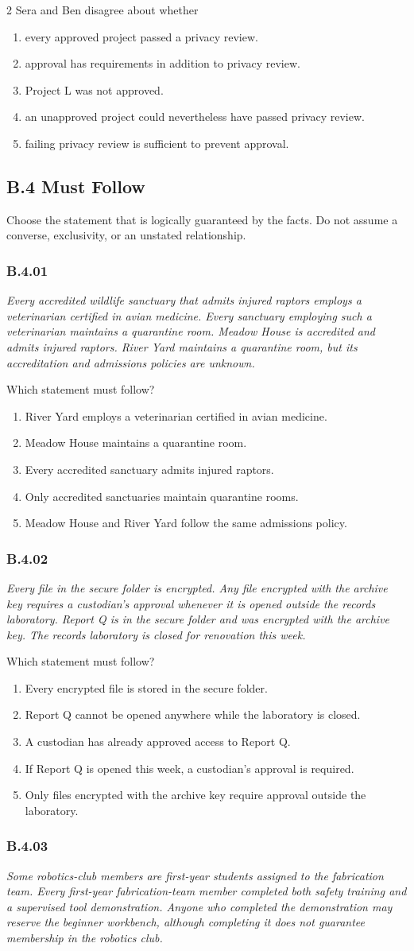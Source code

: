 \documentclass[10pt]{extarticle}
\newcommand{\choice}[1]{\item #1}
\newcommand{\bankitem}[1]{\subsubsection*{#1}}
\begin{document}
\begin{multicols}{2}
Sera and Ben disagree about whether
\begin{enumerate}[label=(\alph*)]
  \choice{every approved project passed a privacy review.}
  \choice{approval has requirements in addition to privacy review.}
  \choice{Project L was not approved.}
  \choice{an unapproved project could nevertheless have passed privacy review.}
  \choice{failing privacy review is sufficient to prevent approval.}
\end{enumerate}
\subsection*{B.4 Must Follow}
Choose the statement that is logically guaranteed by the facts. Do not assume a converse, exclusivity, or an unstated relationship.
\bankitem{B.4.01}
\emph{Every accredited wildlife sanctuary that admits injured raptors employs a veterinarian certified in avian medicine. Every sanctuary employing such a veterinarian maintains a quarantine room. Meadow House is accredited and admits injured raptors. River Yard maintains a quarantine room, but its accreditation and admissions policies are unknown.}

Which statement must follow?
\begin{enumerate}[label=(\alph*)]
  \choice{River Yard employs a veterinarian certified in avian medicine.}
  \choice{Meadow House maintains a quarantine room.}
  \choice{Every accredited sanctuary admits injured raptors.}
  \choice{Only accredited sanctuaries maintain quarantine rooms.}
  \choice{Meadow House and River Yard follow the same admissions policy.}
\end{enumerate}
\bankitem{B.4.02}
\emph{Every file in the secure folder is encrypted. Any file encrypted with the archive key requires a custodian's approval whenever it is opened outside the records laboratory. Report Q is in the secure folder and was encrypted with the archive key. The records laboratory is closed for renovation this week.}

Which statement must follow?
\begin{enumerate}[label=(\alph*)]
  \choice{Every encrypted file is stored in the secure folder.}
  \choice{Report Q cannot be opened anywhere while the laboratory is closed.}
  \choice{A custodian has already approved access to Report Q.}
  \choice{If Report Q is opened this week, a custodian's approval is required.}
  \choice{Only files encrypted with the archive key require approval outside the laboratory.}
\end{enumerate}
\bankitem{B.4.03}
\emph{Some robotics-club members are first-year students assigned to the fabrication team. Every first-year fabrication-team member completed both safety training and a supervised tool demonstration. Anyone who completed the demonstration may reserve the beginner workbench, although completing it does not guarantee membership in the robotics club.}


\end{multicols}
\end{document}
